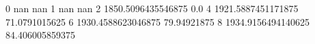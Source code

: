 0 nan nan
1 nan nan
2 1850.5096435546875 0.0
4 1921.5887451171875 71.0791015625
6 1930.4588623046875 79.94921875
8 1934.9156494140625 84.406005859375
